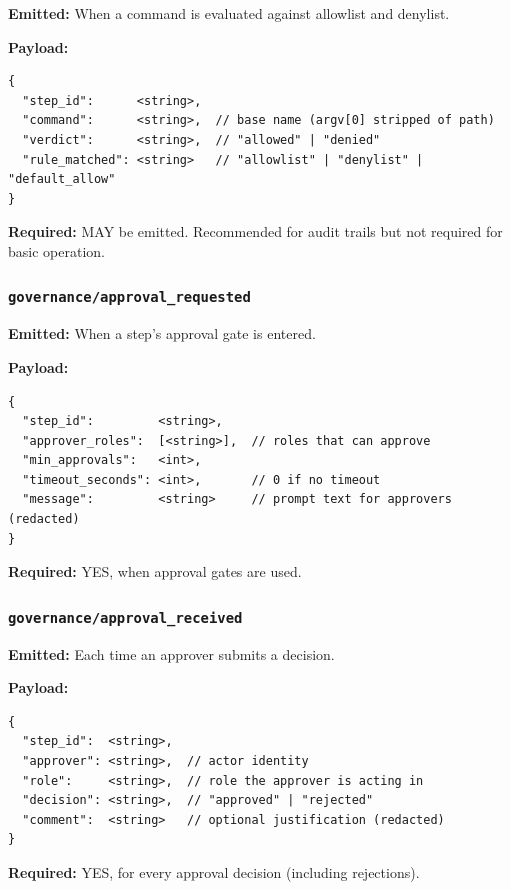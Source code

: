 \textbf{Emitted:} When a command is evaluated against allowlist and denylist.

\textbf{Payload:}
\begin{verbatim}
{
  "step_id":      <string>,
  "command":      <string>,  // base name (argv[0] stripped of path)
  "verdict":      <string>,  // "allowed" | "denied"
  "rule_matched": <string>   // "allowlist" | "denylist" | "default_allow"
}
\end{verbatim}

\textbf{Required:} MAY be emitted. Recommended for audit trails but not required for basic operation.


\subsubsection{\texttt{governance/approval\_requested}}

\textbf{Emitted:} When a step's approval gate is entered.

\textbf{Payload:}
\begin{verbatim}
{
  "step_id":         <string>,
  "approver_roles":  [<string>],  // roles that can approve
  "min_approvals":   <int>,
  "timeout_seconds": <int>,       // 0 if no timeout
  "message":         <string>     // prompt text for approvers (redacted)
}
\end{verbatim}

\textbf{Required:} YES, when approval gates are used.


\subsubsection{\texttt{governance/approval\_received}}

\textbf{Emitted:} Each time an approver submits a decision.

\textbf{Payload:}
\begin{verbatim}
{
  "step_id":  <string>,
  "approver": <string>,  // actor identity
  "role":     <string>,  // role the approver is acting in
  "decision": <string>,  // "approved" | "rejected"
  "comment":  <string>   // optional justification (redacted)
}
\end{verbatim}

\textbf{Required:} YES, for every approval decision (including rejections).

